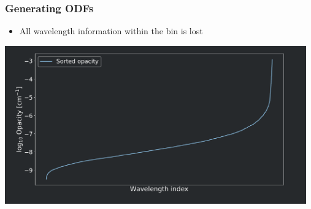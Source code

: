 \frame
{
	\frametitle{Generating ODFs}
	\begin{itemize}
		\item All wavelength information within the bin is lost
\end{itemize}		

		\centering
	\includegraphics[width=130mm]{images/odf_generation_process_2}
}

